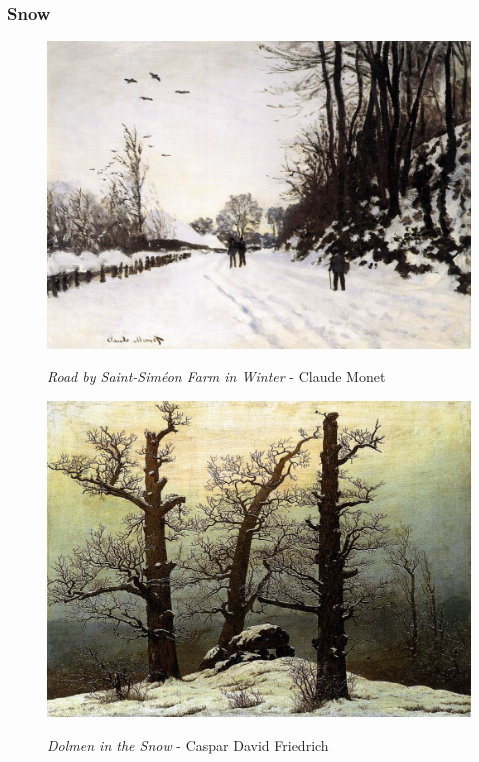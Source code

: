 \documentclass[a4paper]{article}
\begin{document}
\newpage
\subsubsection{Snow}

\begin {figure}[h!]
\centering
\begin{minipage}[b]{.49\textwidth}
	\centering
	\includegraphics[width=\textwidth]{SnowPaintings/_Stl__Road_by_Saint-Sim_on_Farm_in_Winter_-_Monet}
    \caption{\emph{Road by Saint-Siméon Farm in Winter} - Claude Monet}
\end{minipage}
\hfill
\begin{minipage}[b]{.49\textwidth}
	\centering
	\includegraphics[width=\textwidth]{SnowPaintings/_Stl__Dolmen_in_the_Snow_-_Caspar_David_Friedrich.jpg}
    \caption{\emph{Dolmen in the Snow} - Caspar David Friedrich}
\end{minipage}
\end{figure}
\end{document}
